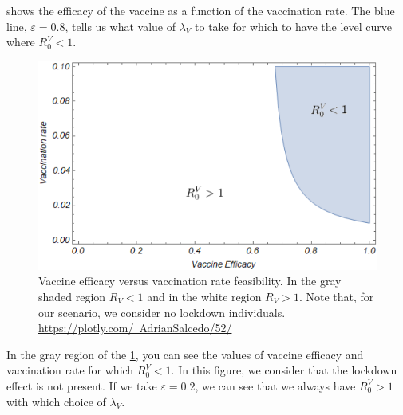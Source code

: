  shows the efficacy of the vaccine
as a function of the vaccination rate. The blue line, $ \varepsilon = 0.8 $,
tells us what value of $ \lambda_V $ to take for which to have
the level curve where $ R_0^V<1 $.

\begin{figure}[tbh]
    \centering
      \includegraphics[scale=0.7, keepaspectratio]{Figures/No-Lockdown-Vaccination}
    \caption{
        Vaccine efficacy versus vaccination rate feasibility.
        In the gray shaded region $R_V<1 $ and in the white region $ R_V >1 $. 
        Note that, for our scenario, we consider no lockdown individuals.
    \href{https://plotly.com/~AdrianSalcedo/52/}{%
		https://plotly.com/~AdrianSalcedo/52/}
    }
    \label{fig:Nolockdown}
\end{figure}

In the gray region of the \cref{fig:Nolockdown}, you can see
the values of vaccine efficacy and vaccination rate for which
$R_0^V <1 $. In this figure, we consider that the lockdown effect is not present.
If we take $ \varepsilon = 0.2 $, we can see that we always have $ R_0^V> 1 $
with which choice of $ \lambda_V $.

